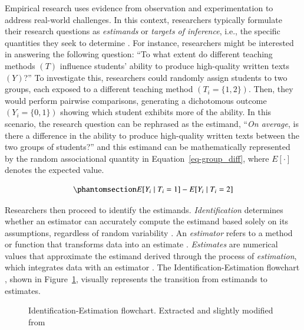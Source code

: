 \documentclass[
  authoryear,
  review,
  1p]{elsarticle}
\begin{document}
Empirical research uses evidence from observation and experimentation to
address real-world challenges. In this context, researchers typically
formulate their research questions as \emph{estimands} or \emph{targets
of inference}, i.e., the specific quantities they seek to determine
\citep{Everitt_et_al_2010}. For instance, researchers might be
interested in answering the following question: ``To what extent do
different teaching methods \((T)\) influence students' ability to
produce high-quality written texts \((Y)\)?'' To investigate this,
researchers could randomly assign students to two groups, each exposed
to a different teaching method \((T_{i} = \{1,2\})\). Then, they would
perform pairwise comparisons, generating a dichotomous outcome
\((Y_{i} = \{0,1\})\) showing which student exhibits more of the
ability. In this scenario, the research question can be rephrased as the
estimand, ``\emph{On average}, is there a difference in the ability to
produce high-quality written texts between the two groups of students?''
and this estimand can be mathematically represented by the random
associational quantity in Equation~\ref{eq-group_diff}, where
\(E[\cdot]\) denotes the expected value.

\begin{equation}\phantomsection\label{eq-group_diff}{
E[Y_{i} \mid T_{i}=1] - E[Y_{i} \mid T_{i}=2]
}\end{equation}

Researchers then proceed to identify the estimands.
\emph{Identification} determines whether an estimator can accurately
compute the estimand based solely on its assumptions, regardless of
random variability \citep[pp.~4]{Schuessler_et_al_2023}. An
\emph{estimator} refers to a method or function that transforms data
into an estimate \citep{Neal_2020}. \emph{Estimates} are numerical
values that approximate the estimand derived through the process of
\emph{estimation}, which integrates data with an estimator
\citep{Everitt_et_al_2010}. The Identification-Estimation flowchart
\citep{McElreath_2020, Neal_2020}, shown in Figure~\ref{fig-IEflow},
visually represents the transition from estimands to estimates.

\begin{figure}


\caption{\label{fig-IEflow}Identification-Estimation flowchart.
Extracted and slightly modified from \citet[pp.~32]{Neal_2020}}

\end{figure}%
\end{document}
